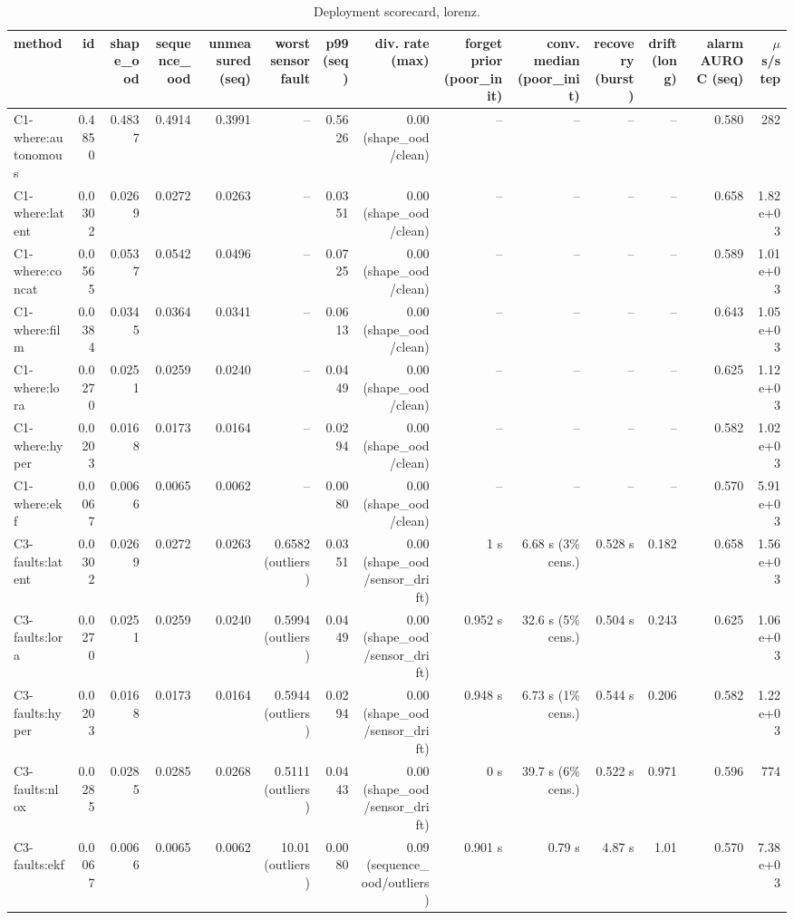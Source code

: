 \begin{table}[t]
\centering
\scriptsize
\caption{Deployment scorecard, lorenz.}
\begin{tabular}{lrrrrrrrrrrrrr}
\toprule
method & id & shape\_ood & sequence\_ood & unmeasured (seq) & worst sensor fault & p99 (seq) & div. rate (max) & forget prior (poor\_init) & conv. median (poor\_init) & recovery (burst) & drift (long) & alarm AUROC (seq) & $\mu$s/step \\
\midrule
C1-where:autonomous & 0.4850 & 0.4837 & 0.4914 & 0.3991 & – & 0.5626 & 0.00 (shape\_ood/clean) & – & – & – & – & 0.580 & 282 \\
C1-where:latent & 0.0302 & 0.0269 & 0.0272 & 0.0263 & – & 0.0351 & 0.00 (shape\_ood/clean) & – & – & – & – & 0.658 & 1.82e+03 \\
C1-where:concat & 0.0565 & 0.0537 & 0.0542 & 0.0496 & – & 0.0725 & 0.00 (shape\_ood/clean) & – & – & – & – & 0.589 & 1.01e+03 \\
C1-where:film & 0.0384 & 0.0345 & 0.0364 & 0.0341 & – & 0.0613 & 0.00 (shape\_ood/clean) & – & – & – & – & 0.643 & 1.05e+03 \\
C1-where:lora & 0.0270 & 0.0251 & 0.0259 & 0.0240 & – & 0.0449 & 0.00 (shape\_ood/clean) & – & – & – & – & 0.625 & 1.12e+03 \\
C1-where:hyper & 0.0203 & 0.0168 & 0.0173 & 0.0164 & – & 0.0294 & 0.00 (shape\_ood/clean) & – & – & – & – & 0.582 & 1.02e+03 \\
C1-where:ekf & 0.0067 & 0.0066 & 0.0065 & 0.0062 & – & 0.0080 & 0.00 (shape\_ood/clean) & – & – & – & – & 0.570 & 5.91e+03 \\
C3-faults:latent & 0.0302 & 0.0269 & 0.0272 & 0.0263 & 0.6582 (outliers) & 0.0351 & 0.00 (shape\_ood/sensor\_drift) & 1 s & 6.68 s (3\% cens.) & 0.528 s & 0.182 & 0.658 & 1.56e+03 \\
C3-faults:lora & 0.0270 & 0.0251 & 0.0259 & 0.0240 & 0.5994 (outliers) & 0.0449 & 0.00 (shape\_ood/sensor\_drift) & 0.952 s & 32.6 s (5\% cens.) & 0.504 s & 0.243 & 0.625 & 1.06e+03 \\
C3-faults:hyper & 0.0203 & 0.0168 & 0.0173 & 0.0164 & 0.5944 (outliers) & 0.0294 & 0.00 (shape\_ood/sensor\_drift) & 0.948 s & 6.73 s (1\% cens.) & 0.544 s & 0.206 & 0.582 & 1.22e+03 \\
C3-faults:nlox & 0.0285 & 0.0285 & 0.0285 & 0.0268 & 0.5111 (outliers) & 0.0443 & 0.00 (shape\_ood/sensor\_drift) & 0 s & 39.7 s (6\% cens.) & 0.522 s & 0.971 & 0.596 & 774 \\
C3-faults:ekf & 0.0067 & 0.0066 & 0.0065 & 0.0062 & 10.01 (outliers) & 0.0080 & 0.09 (sequence\_ood/outliers) & 0.901 s & 0.79 s & 4.87 s & 1.01 & 0.570 & 7.38e+03 \\

\end{tabular}
\end{table}
